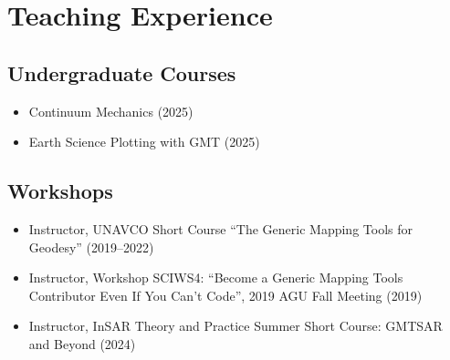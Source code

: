 \section{Teaching Experience}

\subsection{Undergraduate Courses}
\begin{itemize}
\item Continuum Mechanics (2025)
\item Earth Science Plotting with GMT (2025)
\end{itemize}

\subsection{Workshops}
\begin{itemize}
\item Instructor, UNAVCO Short Course ``The Generic Mapping Tools for Geodesy'' (2019--2022)
\item Instructor, Workshop SCIWS4: ``Become a Generic Mapping Tools Contributor Even If You Can't Code'', 2019 AGU Fall Meeting (2019)
\item Instructor, InSAR Theory and Practice Summer Short Course: GMTSAR and Beyond (2024)
\end{itemize}
